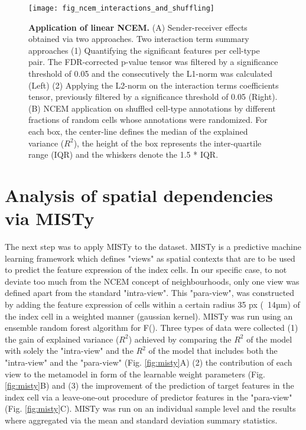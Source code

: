 \begin{figure}[p]
    \centering
    \texttt{[image: fig\_ncem\_interactions\_and\_shuffling]}
    \caption{\textbf{Application of linear NCEM.} (A) Sender-receiver effects obtained via two approaches. Two interaction term summary approaches (1) Quantifying the significant features per cell-type pair. The FDR-corrected p-value tensor was filtered by a significance threshold of 0.05 and the consecutively the L1-norm was calculated (Left) (2) Applying the L2-norm on the interaction terms coefficients tensor, previously filtered by a significance threshold of 0.05 (Right). (B) NCEM application on shuffled cell-type annotations by different fractions of random cells whose annotations were randomized. For each box, the center-line defines the median of the explained variance ($R^2$), the height of the box represents the inter-quartile range (IQR) and the whiskers denote the 1.5 * IQR.}
    \label{fig:ncem}
\end{figure}

\pagebreak


\section{Analysis of spatial dependencies via MISTy}

The next step was to apply MISTy to the dataset. MISTy is a predictive machine learning framework which defines "views" as spatial contexts that are to be used to predict the feature expression of the index cells. In our specific case, to not deviate too much from the NCEM concept of neighbourhoods, only one view was defined apart from the standard "intra-view". This "para-view", was constructed by adding the feature expression of cells within a certain radius 35 px (~14µm) of the index cell in a weighted manner (gaussian kernel). MISTy was run using an ensemble random forest algorithm for F().  Three types of data were collected (1) the gain of explained variance ($R^2$) achieved by comparing the $R^2$ of the model with solely the "intra-view" and the $R^2$ of the model that includes  both the "intra-view" and the "para-view" (Fig. \ref{fig:misty}A) (2) the contribution of each view to the metamodel in form of the learnable weight parameters (Fig. \ref{fig:misty}B) and (3) the improvement of the prediction of target features in the index cell via a leave-one-out procedure of predictor features in the "para-view" (Fig. \ref{fig:misty}C). MISTy was run on an individual sample level and the results where aggregated via the mean and standard deviation summary statistics.

